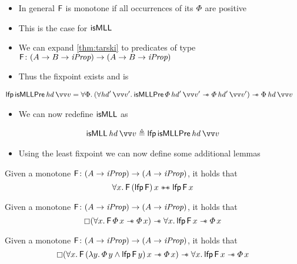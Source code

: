 \documentclass[thesis.tex]{subfiles}
\begin{document}
\begin{itemize}
  \item In general $\textsf{\upshape F}$ is monotone if all occurrences of its $\varPhi$ are positive
  \item This is the case for $\textsf{\upshape isMLL}$
  \item We can expand \cref*{thm:tarski} to predicates of type $\textsf{\upshape F}\colon (A \to B \to \textit{iProp}) \to (A \to B \to \textit{iProp})$
  \item Thus the fixpoint exists and is
\end{itemize}
\begin{align*}
  \lfp\, \textlog{isMLLPre}\, \langv{hd}\, \vect{v} & = \All \Phi. (\All \langv{hd}'\, \vect{v}'. \textlog{isMLLPre}\, \pred\, \langv{hd}'\, \vect{v}' \wand \pred\, \langv{hd}'\, \vect{v}') \wand \Phi \, \langv{hd}\, \vect{v}
\end{align*}
\begin{itemize}
  \item We can now redefine $\textsf{\upshape isMLL}$ as
\end{itemize}
\begin{align*}
  \textlog{isMLL}\, \langv{hd}\, \vect{v} \eqdef \lfp\, \textlog{isMLLPre}\, \langv{hd}\, \vect{v}
\end{align*}
\begin{itemize}
  \item Using the least fixpoint we can now define some additional lemmas
\end{itemize}
\begin{lemma}
  Given a monotone $\textsf{\upshape F}\colon (A \to \textit{iProp}) \to (A \to \textit{iProp})$, it holds that
  \[\All\var.\hopred\,(\lfp\,\hopred)\,\var \wandIff \lfp\,\hopred\,\var\]
\end{lemma}
\begin{lemma}
  Given a monotone $\textsf{\upshape F}\colon (A \to \textit{iProp}) \to (A \to \textit{iProp})$, it holds that
  \[\always(\All\var.\hopred\,\pred\,\var \wand \pred\,\var) \wand \All\var. \lfp\,\hopred\,\var \wand \pred\,\var\]
\end{lemma}
\begin{lemma}
  Given a monotone $\textsf{\upshape F}\colon (A \to \textit{iProp}) \to (A \to \textit{iProp})$, it holds that
  \[\always(\All\var.\hopred\,(\Lam\varB. \pred\,\varB \land \lfp\,\hopred\,\varB)\,\var \wand \pred\,\var) \wand \All\var. \lfp\,\hopred\,\var \wand \pred\,\var\]
\end{lemma}
\end{document}
